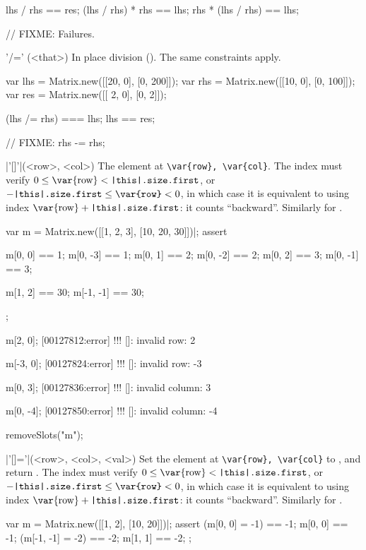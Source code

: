 \begin{urbiscriptapi}
\begin{urbiassert}
lhs / rhs == res;
(lhs / rhs) * rhs == lhs;
rhs * (lhs / rhs) == lhs;

// FIXME: Failures.
\end{urbiassert}

\item['/='](<that>)%
  In place division ().  The same constraints apply.
\begin{urbiassert}
var lhs = Matrix.new([[20, 0], [0, 200]]);
var rhs = Matrix.new([[10, 0], [0, 100]]);
var res = Matrix.new([[ 2, 0], [0,   2]]);

(lhs /= rhs) === lhs;
lhs == res;

// FIXME: rhs -= rhs;
\end{urbiassert}


\item|'[]'|(<row>, <col>)%
  The element at \lstinline|\var{row}, \var{col}|.  The index  must
  verify $0 \le \textrm{\var{row}} < \texttt{\this.size.first}$, or
  $-\texttt{\this.size.first} \le \texttt{\var{row}} < 0$, in which case it
  is equivalent to using index $\textrm{\var{row}} +
  \texttt{\this.size.first}$: it counts ``backward''.  Similarly for
  .
\begin{urbiscript}
var m = Matrix.new([[1, 2, 3], [10, 20, 30]])|;
assert
{
  m[0, 0] == 1;   m[0, -3] == 1;
  m[0, 1] == 2;   m[0, -2] == 2;
  m[0, 2] == 3;   m[0, -1] == 3;

  m[1, 2] == 30;  m[-1, -1] == 30;
};

m[2, 0];
[00127812:error] !!! []: invalid row: 2

m[-3, 0];
[00127824:error] !!! []: invalid row: -3

m[0, 3];
[00127836:error] !!! []: invalid column: 3

m[0, -4];
[00127850:error] !!! []: invalid column: -4
\end{urbiscript}
\begin{urbicomment}
  removeSlots("m");
\end{urbicomment}

\item|'[]='|(<row>, <col>, <val>)%
  Set the element at \lstinline|\var{row}, \var{col}| to , and
  return .  The index  must verify $0 \le
  \textrm{\var{row}} < \texttt{\this.size.first}$, or
  $-\texttt{\this.size.first} \le \texttt{\var{row}} < 0$, in which case it
  is equivalent to using index $\textrm{\var{row}} +
  \texttt{\this.size.first}$: it counts ``backward''.  Similarly for
  .
\begin{urbiscript}
var m = Matrix.new([[1, 2], [10, 20]])|;
assert
{
  (m[0, 0]  = -1) == -1;   m[0, 0] == -1;
  (m[-1, -1] = -2) == -2;  m[1, 1] == -2;
};


\end{urbiscript}
\end{urbiscriptapi}
